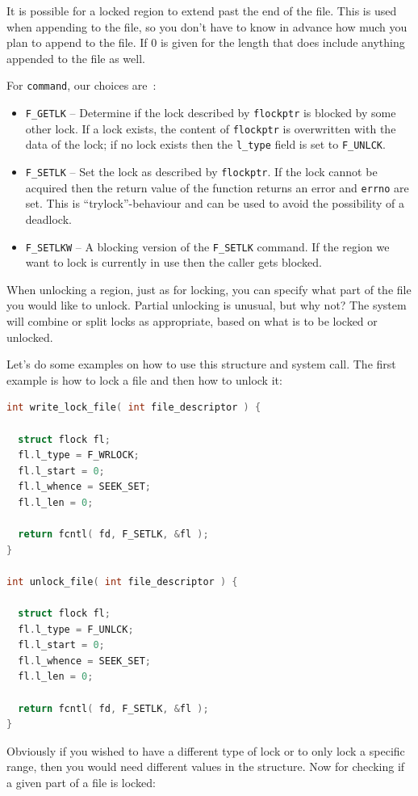 It is possible for a locked region to extend past the end of the file. This is used when appending to the file, so you don't have to know in advance how much you plan to append to the file. If 0 is given for the length that does include anything appended to the file as well.


For \texttt{command}, our choices are~\cite{apunix}:
\begin{itemize}
	\item \texttt{F\_GETLK} -- Determine if the lock described by \texttt{flockptr} is blocked by some other lock. If a lock exists, the content of \texttt{flockptr} is overwritten with the data of the lock; if no lock exists then the \texttt{l\_type} field is set to \texttt{F\_UNLCK}.
	\item \texttt{F\_SETLK} -- Set the lock as described by \texttt{flockptr}. If the lock cannot be acquired then the return value of the function returns an error and \texttt{errno} are set. This is ``trylock''-behaviour and can be used to avoid the possibility of a deadlock.
	\item \texttt{F\_SETLKW} -- A blocking version of the \texttt{F\_SETLK} command. If the region we want to lock is currently in use then the caller gets blocked.
\end{itemize}

When unlocking a region, just as for locking, you can specify what part of the file you would like to unlock. Partial unlocking is unusual, but why not? The system will combine or split locks as appropriate, based on what is to be locked or unlocked.

Let's do some examples on how to use this structure and system call. The first example is how to lock a file and then how to unlock it:

\begin{lstlisting}[language=C]
int write_lock_file( int file_descriptor ) {

  struct flock fl;
  fl.l_type = F_WRLOCK;
  fl.l_start = 0;
  fl.l_whence = SEEK_SET;
  fl.l_len = 0;
  
  return fcntl( fd, F_SETLK, &fl );
}

int unlock_file( int file_descriptor ) {

  struct flock fl;
  fl.l_type = F_UNLCK;
  fl.l_start = 0;
  fl.l_whence = SEEK_SET;
  fl.l_len = 0;
  
  return fcntl( fd, F_SETLK, &fl );
}
\end{lstlisting}

Obviously if you wished to have a different type of lock or to only lock a specific range, then you would need different values in the structure. Now for checking if a given part of a file is locked:


